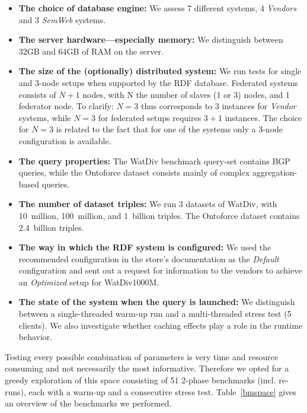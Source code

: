 \begin{itemize}
	\item \textbf{The choice of database engine:} We assess 7 different systems, 4 \emph{Vendors} and 3 \emph{SemWeb} systems.
	\item \textbf{The server hardware---especially memory:} We distinguish between 32GB and 64GB of RAM on the server.
	\item \textbf{The size of the (optionally) distributed system:} We run tests for single and 3-node setups when supported by the RDF database. Federated systems consists of $N+1$ nodes, with N the number of slaves (1 or 3) nodes, and 1 federator node. To clarify: $N=3$ thus corresponds to 3 instances for \emph{Vendor} systems, while $N=3$ for federated setups requires $3+1$ instances. The choice for $N=3$ is related to the fact that for one of the systems only a 3-node configuration is available.
	\item \textbf{The query properties:} The WatDiv benchmark query-set contains BGP queries, while the Ontoforce dataset consists mainly of complex aggregation-based queries.
	\item \textbf{The number of dataset triples:} We run 3 datasets of WatDiv, with 10~million, 100~million, and 1~billion triples. The Ontoforce dataset contains 2.4~billion triples.
	\item \textbf{The way in which the RDF system is configured:} We used the recommended configuration in the store's documentation as the \emph{Default} configuration and sent out a request for information to the vendors to achieve an \emph{Optimized} setup for WatDiv1000M.
	\item \textbf{The state of the system when the query is launched:} We distinguish between a single-threaded warm-up run and a multi-threaded stress test (5 clients). We also investigate whether caching effects play a role in the runtime behavior.
\end{itemize} 


Testing every possible combination of parameters is very time and resource consuming and not necessarily the most informative. Therefore we opted for a greedy exploration of this space consisting of 51 2-phase  benchmarks (incl. re-runs), each with a warm-up and a consecutive stress test. Table~\ref{bmspace} gives an overview of the benchmarks we performed.


